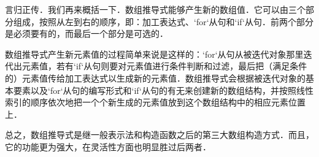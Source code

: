 言归正传．我们再来概括一下．数组推导式能够产生新的数组值．它可以由三个部分组成，按照从左到右的顺序，即：加工表达式、`for`从句和`if`从句．前两个部分是必须要有的，而最后一个部分是可选的．

数组推导式产生新元素值的过程简单来说是这样的：`for`从句从被迭代对象那里迭代出元素值，若有`if`从句则要对元素值进行条件判断和过滤，最后把（满足条件的）元素值传给加工表达式以生成新的元素值．数组推导式会根据被迭代对象的基本要素以及`for`从句的编写形式和`if`从句的有无来创建新的数组结构，并按照线性索引的顺序依次地把一个个新生成的元素值放到这个数组结构中的相应元素位置上．

总之，数组推导式是继一般表示法和构造函数之后的第三大数组构造方式．而且，它的功能更为强大，在灵活性方面也明显胜过后两者．